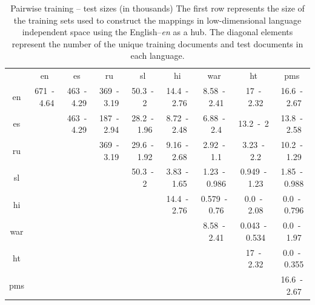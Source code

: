 \documentclass[twoside,11pt]{article}
\begin{document}
%

{
\renewcommand\tabcolsep{3pt}
\begin{table}[h!]
\centering
\caption{Pairwise training -- test sizes (in thousands)
The first row represents the size of the training sets used to construct the mappings in low-dimensional language independent space using the English--\emph{en} as a hub. The diagonal elements represent the number of the unique training documents and test documents in each language.
}
\label{table:train_test}
{
\small
\begin{tabular}{c|c|c|c|c|c|c|c|c|}
&	en&	es&	ru&	sl&	hi&	war&	ht&	pms\\\cline{1-9}
en&	671~-~4.64&	463~-~4.29&	369~-~3.19&	50.3~-~2&	14.4~-~2.76&	8.58~-~2.41&	 17~-~2.32&	16.6~-~2.67\\
\cline{2-9}
es&	\multicolumn{1}{c|}{}	&	463~-~4.29&	187~-~2.94&	28.2~-~1.96&	8.72~-~2.48&	 6.88~-~2.4&	13.2~-~2&	 13.8~-~2.58\\
\cline{3-9}
ru&	\multicolumn{2}{c|}{}	&	369~-~3.19&	29.6~-~1.92&	9.16~-~2.68&	2.92~-~1.1&	 3.23~-~2.2&	10.2~-~1.29\\
\cline{4-9}
sl&	\multicolumn{3}{c|}{}	&	50.3~-~2&	3.83~-~1.65&	1.23~-~0.986&	0.949~-~1.23&	 1.85~-~0.988\\
\cline{5-9}
hi&	\multicolumn{4}{c|}{}	&	14.4~-~2.76&	0.579~-~0.76&	0.0~-~2.08&	0.0~-~0.796\\
\cline{6-9}
war&	\multicolumn{5}{c|}{}	&	8.58~-~2.41&	0.043~-~0.534&	0.0~-~1.97\\
\cline{7-9}
ht&	\multicolumn{6}{c|}{}	&	17~-~2.32&	0.0~-~0.355\\
\cline{8-9}
pms&	\multicolumn{7}{c|}{}	&	16.6~-~2.67\\
\cline{9-9}
\end{tabular}
}
\end{table}
}
\end{document}
